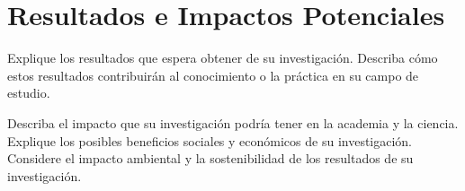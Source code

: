 \chapter{Resultados e Impactos Potenciales}

Explique los resultados que espera obtener de su investigación.
Describa cómo estos resultados contribuirán al conocimiento o la práctica en su campo de estudio.
 
Describa el impacto que su investigación podría tener en la academia y la ciencia.
Explique los posibles beneficios sociales y económicos de su investigación.
Considere el impacto ambiental y la sostenibilidad de los resultados de su investigación.



